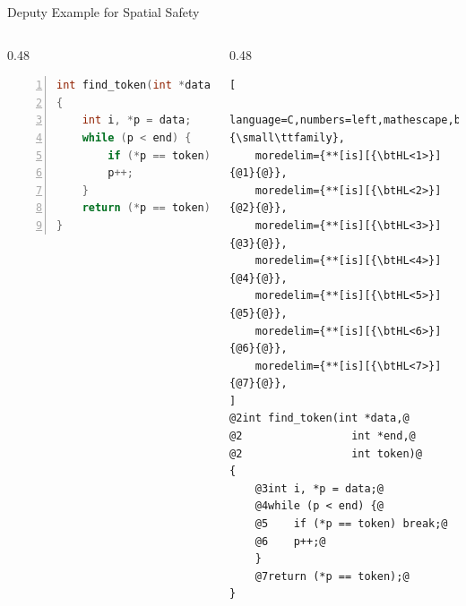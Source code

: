\documentclass[aspectratio=169]{beamer}
\begin{document}
\begin{frame}[fragile]{Deputy Example for Spatial Safety}
\begin{columns}[T]
\begin{column}{0.48\textwidth}
\begin{lstlisting}[language=C,numbers=left,mathescape,basicstyle={\small\ttfamily}]
int find_token(int *data, int *end, int token)
{
    int i, *p = data;
    while (p < end) {
        if (*p == token) break;
        p++;
    }
    return (*p == token);
}
\end{lstlisting}
\end{column}


\begin{column}{0.48\textwidth}
\begin{lstlisting}[
    language=C,numbers=left,mathescape,basicstyle={\small\ttfamily},
    moredelim={**[is][{\btHL<1>}]{@1}{@}},
    moredelim={**[is][{\btHL<2>}]{@2}{@}},
    moredelim={**[is][{\btHL<3>}]{@3}{@}},
    moredelim={**[is][{\btHL<4>}]{@4}{@}},
    moredelim={**[is][{\btHL<5>}]{@5}{@}},
    moredelim={**[is][{\btHL<6>}]{@6}{@}},
    moredelim={**[is][{\btHL<7>}]{@7}{@}},
]
@2int find_token(int *data,@
@2                 int *end,@
@2                 int token)@
{
    @3int i, *p = data;@
    @4while (p < end) {@
    @5    if (*p == token) break;@
    @6    p++;@
    }
    @7return (*p == token);@
}
\end{lstlisting}
\end{column}

\end{columns}
\end{frame}
\end{document}
